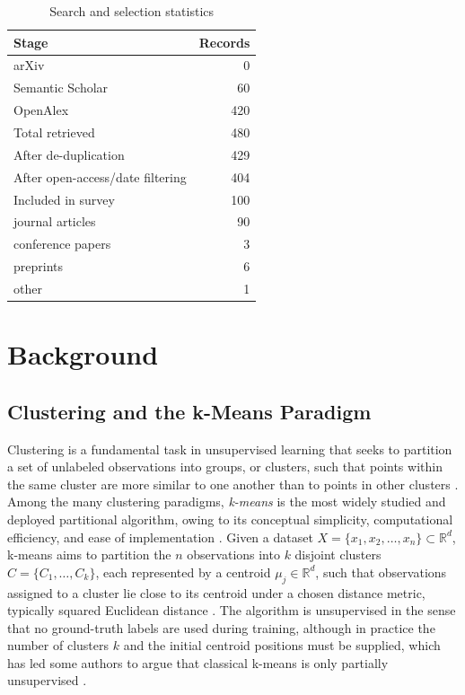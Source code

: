 \begin{table}[!t]
\centering
\caption{Search and selection statistics}\label{tab:prisma}
\begin{tabular}{@{}lr@{}}
\toprule
\textbf{Stage} & \textbf{Records} \\
\midrule
arXiv & 0 \\
Semantic Scholar & 60 \\
OpenAlex & 420 \\
\midrule
Total retrieved & 480 \\
After de-duplication & 429 \\
After open-access/date filtering & 404 \\
Included in survey & 100 \\
\midrule
\quad journal articles & 90 \\
\quad conference papers & 3 \\
\quad preprints & 6 \\
\quad other & 1 \\
\bottomrule
\end{tabular}
\end{table}

\section{Background}\label{sec:background}
\subsection{Clustering and the k-Means Paradigm}
Clustering is a fundamental task in unsupervised learning that seeks to partition a set of unlabeled observations into groups, or clusters, such that points within the same cluster are more similar to one another than to points in other clusters \cite{sinaga2020unsupervised}. Among the many clustering paradigms, \emph{k-means} is the most widely studied and deployed partitional algorithm, owing to its conceptual simplicity, computational efficiency, and ease of implementation \cite{chong2021means,oti2021comprehensive}. Given a dataset $X = \{x_1, x_2, \dots, x_n\} \subset \mathbb{R}^d$, k-means aims to partition the $n$ observations into $k$ disjoint clusters $C = \{C_1, \dots, C_k\}$, each represented by a centroid $\mu_j \in \mathbb{R}^d$, such that observations assigned to a cluster lie close to its centroid under a chosen distance metric, typically squared Euclidean distance \cite{oti2021comprehensive}. The algorithm is unsupervised in the sense that no ground-truth labels are used during training, although in practice the number of clusters $k$ and the initial centroid positions must be supplied, which has led some authors to argue that classical k-means is only partially unsupervised \cite{sinaga2020unsupervised}.

